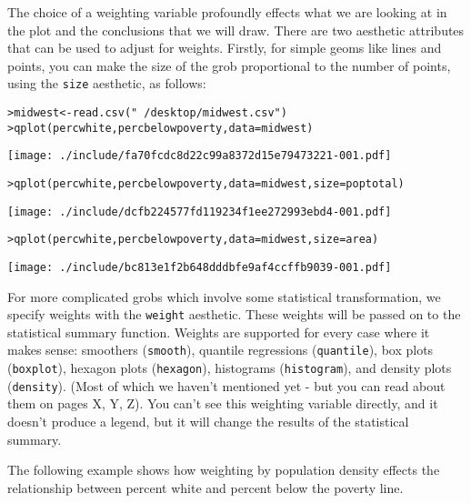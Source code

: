 \noindent The choice of a weighting variable profoundly effects what we are looking at in the plot and the conclusions that we will draw.  There are two aesthetic attributes that can be used to adjust for weights.  Firstly, for simple geoms like lines and points, you can make the size of the grob proportional to the number of points, using the {\tt size} aesthetic, as follows:

\begin{alltt}
> midwest <- read.csv("~/desktop/midwest.csv")
> qplot(percwhite, percbelowpoverty, data = midwest)
\end{alltt}
\texttt{[image: ./include/fa70fcdc8d22c99a8372d15e79473221-001.pdf]}
\begin{alltt}

> qplot(percwhite, percbelowpoverty, data = midwest, size = poptotal)
\end{alltt}
\texttt{[image: ./include/dcfb224577fd119234f1ee272993ebd4-001.pdf]}
\begin{alltt}

> qplot(percwhite, percbelowpoverty, data = midwest, size = area)
\end{alltt}
\texttt{[image: ./include/bc813e1f2b648dddbfe9af4ccffb9039-001.pdf]}
\begin{alltt}

\end{alltt}

For more complicated grobs which involve some statistical transformation, we specify weights with the {\tt weight} aesthetic.  These weights will be passed on to the statistical summary function.  Weights are supported for every case where it makes sense: smoothers ({\tt smooth}), quantile regressions ({\tt quantile}), box plots ({\tt boxplot}), hexagon plots ({\tt hexagon}), histograms ({\tt histogram}), and density plots ({\tt density}).  (Most of which we haven't mentioned yet - but you can read about them on pages X, Y, Z).  You can't see this weighting variable directly, and it doesn't produce a legend, but it will change the results of the statistical summary.

The following example shows how weighting by population density effects the relationship between percent white and percent below the poverty line.


